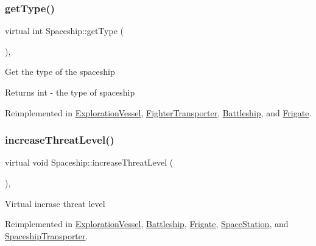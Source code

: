 \mbox{\label{classSpaceship_a113055e6d793f8fbc55e44efc4d57e07}} 
\subsubsection{\texorpdfstring{get\+Type()}{getType()}}
{\footnotesize\ttfamily virtual int Spaceship\+::get\+Type (\begin{DoxyParamCaption}{ }\end{DoxyParamCaption})\hspace{0.3cm}{\ttfamily [inline]}, {\ttfamily [virtual]}}

Get the type of the spaceship \begin{DoxyReturn}{Returns}
int -\/ the type of spaceship 
\end{DoxyReturn}


Reimplemented in \hyperlink{classExplorationVessel_ab06e219200100bbd40a8f79702e52ae8}{Exploration\+Vessel}, \hyperlink{classFighterTransporter_ad173e903951580bb222eb94896a15407}{Fighter\+Transporter}, \hyperlink{classBattleship_a5fadf030665554b56456467e98c75228}{Battleship}, and \hyperlink{classFrigate_a9716770249d0a26a114a69e5e3794bd9}{Frigate}.

\mbox{\label{classSpaceship_a5ddf702124286d9d3a6b5e64c09515bc}} 
\subsubsection{\texorpdfstring{increase\+Threat\+Level()}{increaseThreatLevel()}}
{\footnotesize\ttfamily virtual void Spaceship\+::increase\+Threat\+Level (\begin{DoxyParamCaption}{ }\end{DoxyParamCaption})\hspace{0.3cm}{\ttfamily [inline]}, {\ttfamily [virtual]}}

Virtual incrase threat level 

Reimplemented in \hyperlink{classExplorationVessel_a2f164fa9477a2624c5f04b4d9d84ec84}{Exploration\+Vessel}, \hyperlink{classBattleship_a4db634686a840f3348c2a124e5f42d66}{Battleship}, \hyperlink{classFrigate_ab4dd2319ec0a045e613c85b2c599a3e2}{Frigate}, \hyperlink{classSpaceStation_aa9390e8af0d69fc176c190f8f6891736}{Space\+Station}, and \hyperlink{classSpaceshipTransporter_ac581cb475c2eeab71c976d708f3fcb87}{Spaceship\+Transporter}.

